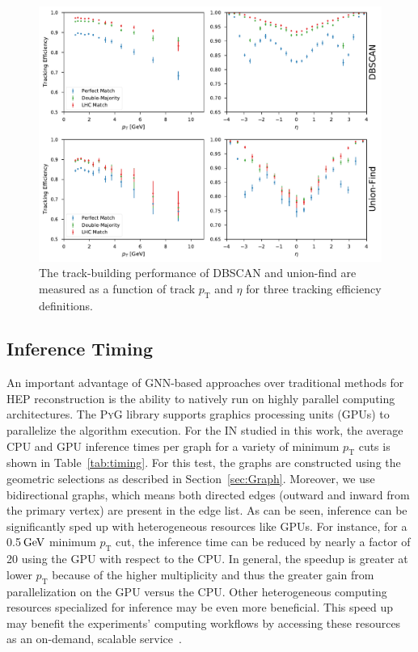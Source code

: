 \documentclass[twocolumn]{svjour3}
\newcommand{\pt}{\ensuremath{p_{\mathrm{T}}}\xspace}
\newcommand{\GeV}{\ensuremath{\,\text{Ge\hspace{-.08em}V}}\xspace}
\begin{document}
\begin{figure}[!htbp]
\centering
\captionsetup{labelfont=bf}
\includegraphics[width=2\columnwidth,clip]{tracking_efficiencies.pdf}
\caption{The track-building performance of DBSCAN and union-find are measured as a function of track $\pt$ and $\eta$ for three tracking efficiency definitions. }
\label{fig:tracking-effs}
\end{figure}


\subsection{Inference Timing}
\label{sec:timing}

An important advantage of GNN-based approaches over traditional methods for HEP reconstruction is the ability to natively run on highly parallel computing architectures.
The \textsc{PyG} library supports graphics processing units (GPUs) to parallelize the algorithm execution.
For the IN studied in this work, the average CPU and GPU inference times per graph for a variety of minimum $\pt$ cuts is shown in Table~\ref{tab:timing}.
For this test, the graphs are constructed using the geometric selections as described in Section~\ref{sec:Graph}. 
Moreover, we use bidirectional graphs, which means both directed edges (outward and inward from the primary vertex) are present in the edge list.
As can be seen, inference can be significantly sped up with heterogeneous resources like GPUs.
For instance, for a 0.5\GeV minimum \pt cut, the inference time can be reduced by nearly a factor of 20 using the GPU with respect to the CPU.
In general, the speedup is greater at lower \pt because of the higher multiplicity and thus the greater gain from parallelization on the GPU versus the CPU.
Other heterogeneous computing resources specialized for inference may be even more beneficial. 
This speed up may benefit the experiments' computing workflows by accessing these resources as an on-demand, scalable service~\cite{Krupa:2020bwg,Rankin:2020usv,Wang:2020fjr}.
\end{document}
